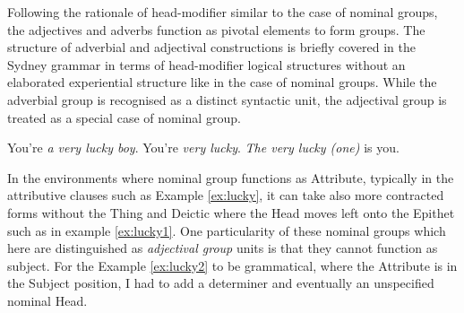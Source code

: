 	Following the rationale of head-modifier similar to the case of nominal groups, the adjectives and adverbs function as pivotal elements to form groups. The structure of adverbial and adjectival constructions is briefly covered in the Sydney grammar in terms of head-modifier logical structures without an elaborated experiential structure like in the case of nominal groups. While the adverbial group is recognised as a distinct syntactic unit, the adjectival group is treated as a special case of nominal group. %
	
	\begin{exe}
		\ex\label{ex:lucky} You're \textit{a very lucky boy}.
        \ex\label{ex:lucky1} You're \textit{very lucky}.
        \ex\label{ex:lucky2} \textit{The very lucky (one)} is you.
	\end{exe}
	
    

    In the environments where nominal group functions as Attribute, typically in the attributive clauses such as Example \ref{ex:lucky}, it can take also more contracted forms without the Thing and Deictic where the Head moves left onto the Epithet such as in example \ref{ex:lucky1}. One particularity of these nominal groups which here are distinguished as \textit{adjectival group} units is that they cannot function as subject. For the Example \ref{ex:lucky2} to be grammatical, where the Attribute is in the Subject position, I had to add a determiner and eventually an unspecified nominal Head. 

    
    
	
